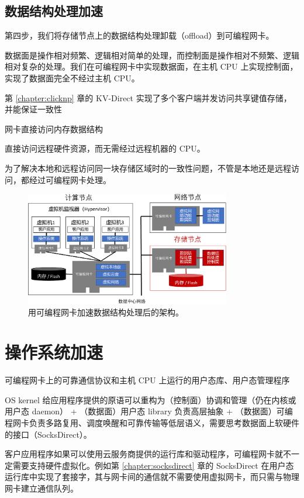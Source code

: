 \subsection{数据结构处理加速}

第四步，我们将存储节点上的数据结构处理卸载（offload）到可编程网卡。

数据面是操作相对频繁、逻辑相对简单的处理，而控制面是操作相对不频繁、逻辑相对复杂的处理。我们在可编程网卡中实现数据面，在主机 CPU 上实现控制面，实现了数据面完全不经过主机 CPU。

第 \ref{chapter:clicknp} 章的 KV-Direct 实现了多个客户端并发访问共享键值存储，并能保证一致性

网卡直接访问内存数据结构

直接访问远程硬件资源，而无需经过远程机器的 CPU。

为了解决本地和远程访问同一块存储区域时的一致性问题，不管是本地还是远程访问，都经过可编程网卡处理。

\begin{figure}[htbp]
	\centering
	\includegraphics[width=0.8\textwidth]{figures/data_structure_accel.pdf}
	\caption{用可编程网卡加速数据结构处理后的架构。}
	\label{arch:fig:data-structure-accel}
\end{figure}

\section{操作系统加速}

可编程网卡上的可靠通信协议和主机 CPU 上运行的用户态库、用户态管理程序

OS kernel 给应用程序提供的原语可以重构为（控制面）协调和管理（仍在内核或用户态 daemon） + （数据面）用户态 library 负责高层抽象 + （数据面）可编程网卡负责多路复用、调度唤醒和可靠传输等低层语义，需要思考数据面上软硬件的接口（SocksDirect）。

客户应用程序如果可以使用云服务商提供的运行库和驱动程序，可编程网卡就不一定需要支持硬件虚拟化。例如第 \ref{chapter:socksdirect} 章的 SocksDirect 在用户态运行库中实现了套接字，其与网卡间的通信就不需要使用虚拟网卡，而只需与物理网卡建立通信队列。

